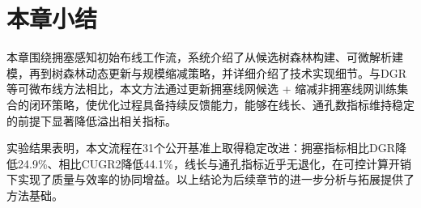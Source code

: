

\section{本章小结}
\label{sec:chap3-summary}

本章围绕拥塞感知初始布线工作流，系统介绍了从候选树森林构建、可微解析建模，再到树森林动态更新与规模缩减策略，并详细介绍了技术实现细节。与DGR等可微布线方法相比，本文方法通过更新拥塞线网候选 + 缩减非拥塞线网训练集合的闭环策略，使优化过程具备持续反馈能力，能够在线长、通孔数指标维持稳定的前提下显著降低溢出相关指标。

实验结果表明，本文流程在31个公开基准上取得稳定改进：拥塞指标相比DGR降低24.9\%、相比CUGR2降低44.1\%，线长与通孔指标近乎无退化，在可控计算开销下实现了质量与效率的协同增益。以上结论为后续章节的进一步分析与拓展提供了方法基础。

